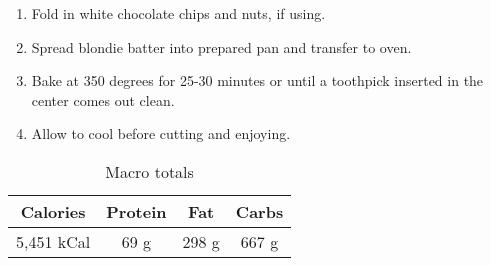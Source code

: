 \begin{multicols}{2}
\begin{enumerate}
\medskip
\item Fold in white chocolate chips and nuts, if using.
\medskip

\medskip
\item Spread blondie batter into prepared pan and transfer to oven.
\medskip

\medskip
\item Bake at 350 degrees for 25-30 minutes or until a toothpick inserted in the center comes out clean.
\medskip

\medskip
\item Allow to cool before cutting and enjoying.
\medskip

\end{enumerate}
\begin{table}[H]
  \begin{center}
    \caption{Macro totals}
    \label{tab:table1}
    \begin{tabular}{c|c|c|c} %
      \textbf{Calories} & \textbf{Protein} & \textbf{Fat} & \textbf{Carbs}\\
      \hline
     5,451  kCal & 69 g & 298 g & 667 g\\
    \end{tabular}
  \end{center}
\end{table}
\end{multicols}